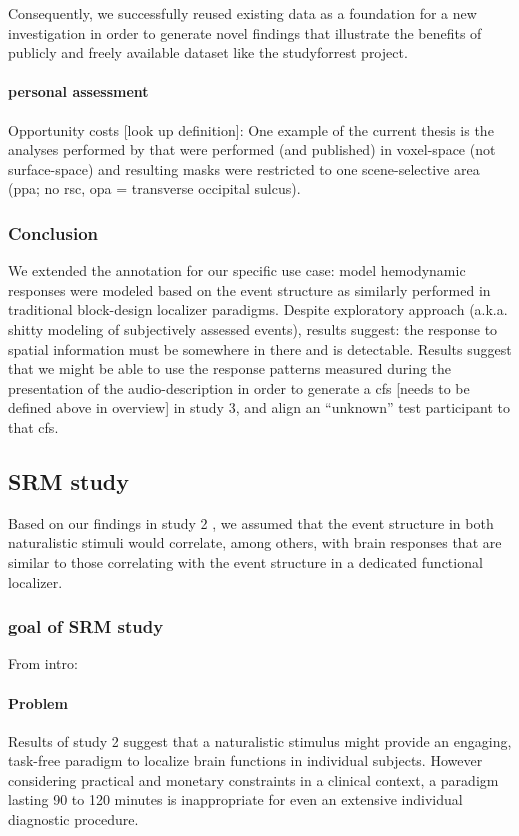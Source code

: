 %
Consequently, we successfully reused existing data as a foundation for a new
investigation in order to generate novel findings that illustrate the benefits
of publicly and freely available dataset like the studyforrest project.


\paragraph{personal assessment}

%
Opportunity costs [look up definition]: One example of the current thesis is the
analyses performed by \citet{sengupta2016extension} that were performed (and
published) in voxel-space (not surface-space) and resulting masks were
restricted to one scene-selective area (\ac{ppa}; no \ac{rsc}, \ac{opa} =
transverse occipital sulcus).


\subsubsection{Conclusion}
%
We extended the annotation for our specific use case:
%
model hemodynamic responses were modeled based on the event structure as
similarly performed in traditional block-design localizer paradigms.
%
Despite exploratory approach (a.k.a. shitty modeling of subjectively assessed
events), results suggest:
%
the response to spatial information must be somewhere in there and is
detectable.
%
Results suggest that we might be able to use the response patterns
measured during the presentation of the audio-description in order to generate a
\ac{cfs} [needs to be defined above in overview] in study 3, and
align an ``unknown'' test participant to that \ac{cfs}.


\subsection{SRM study}

Based on our findings in study 2 \citep{haeusler2022processing}, we assumed that
the event structure in both naturalistic stimuli would correlate, among others,
with brain responses that are similar to those correlating with the event
structure in a dedicated functional localizer.

\subsubsection{goal of SRM study}

From intro:
\paragraph{Problem}
Results of study 2 suggest that a naturalistic stimulus might provide an
engaging, task-free paradigm to localize brain functions in individual subjects.
%
However considering practical and monetary constraints in a clinical context, a
paradigm lasting 90 to 120 minutes is inappropriate for even an extensive
individual diagnostic procedure.


